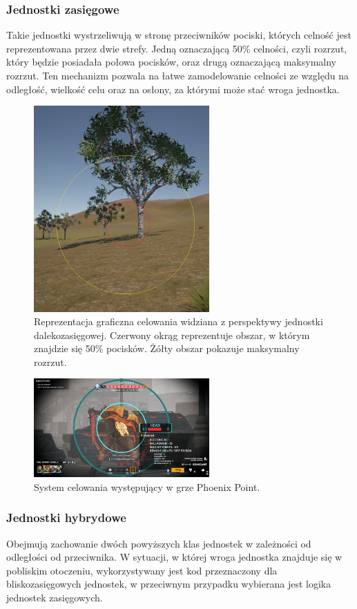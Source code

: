 \subsubsection{Jednostki zasięgowe}
Takie jednostki wystrzeliwują w stronę przeciwników pociski, których celność jest reprezentowana przez dwie strefy. Jedną oznaczającą 50\% celności,
czyli rozrzut, który będzie posiadała połowa pocisków, oraz drugą oznaczającą maksymalny rozrzut. Ten mechanizm pozwala na łatwe zamodelowanie
celności ze względu na odległość, wielkość celu oraz na osłony, za którymi może stać wroga jednostka.
\begin{figure}[h]
\centering
\includegraphics[width=0.6\textwidth]{images/acc}
\caption{Reprezentacja graficzna celowania widziana z perspektywy jednostki dalekozasięgowej. Czerwony okrąg reprezentuje obszar, w którym znajdzie się 50\% pocisków. Żółty obszar pokazuje maksymalny rozrzut.}
\label{fig:acc2}
\end{figure}
\begin{figure}[h]
\centering
\includegraphics[width=0.6\textwidth]{images/point}
\caption{System celowania występujący w grze Phoenix Point.}
\label{fig:acc}
\end{figure}
\subsubsection{Jednostki hybrydowe}
Obejmują zachowanie dwóch powyższych klas jednostek w zależności od odległości od przeciwnika.
W sytuacji, w której wroga jednostka znajduje się w pobliskim otoczeniu, wykorzystywany jest kod przeznaczony dla bliskozasięgowych jednostek,
w przeciwnym przypadku wybierana jest logika jednostek zasięgowych.
